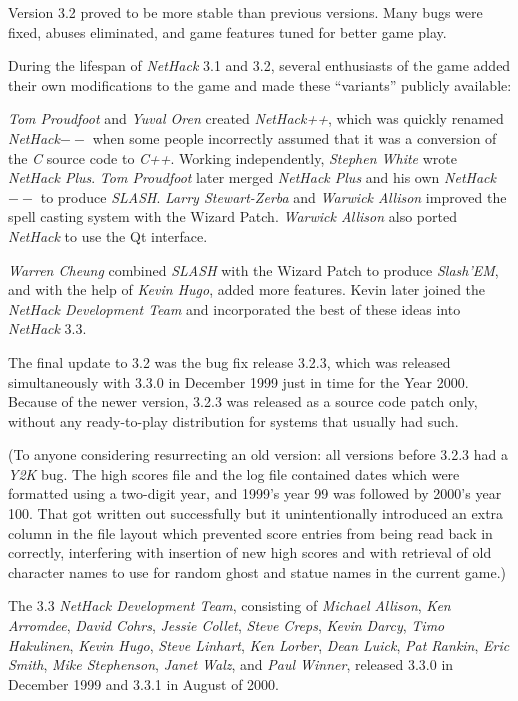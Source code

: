\documentclass[titlepage]{article}
\begin{document}
Version 3.2 proved to be more stable than previous versions.
Many bugs were fixed, abuses eliminated, and game features tuned for
better game play.

\medskip
During the lifespan of \textit{NetHack} 3.1 and 3.2, several enthusiasts
of the game added
their own modifications to the game and made these ``variants'' publicly
available:

\medskip
\textit{Tom Proudfoot} and \textit{Yuval Oren} created \textit{NetHack++},
which was quickly renamed \textit{NetHack$--$}
when some people incorrectly assumed that it was a conversion of the
\textit{C} source code to \textit{C++}.
Working independently, \textit{Stephen White} wrote \textit{NetHack Plus}.
\textit{Tom Proudfoot} later merged \textit{NetHack Plus}
and his own \textit{NetHack$--$} to produce \textit{SLASH}.
\textit{Larry Stewart-Zerba} and \textit{Warwick Allison} improved the spell
casting system with the Wizard Patch.
\textit{Warwick Allison} also ported \textit{NetHack} to use the Qt interface.

\medskip
\textit{Warren Cheung} combined \textit{SLASH} with the Wizard Patch
to produce \textit{Slash'EM}, and
with the help of \textit{Kevin Hugo}, added more features.
Kevin later joined the \textit{NetHack Development Team} and incorporated
the best of these ideas into \textit{NetHack} 3.3.

\medskip
The final update to 3.2 was the bug fix release 3.2.3, which was released
simultaneously with 3.3.0 in December 1999 just in time for the Year 2000.
Because of the newer version, 3.2.3 was released as a source code patch only,
without any ready-to-play distribution for systems that usually had such.

(To anyone considering resurrecting an old version:  all versions before
3.2.3 had a \textit{Y2K} bug.
The high scores file and the log file contained
dates which were formatted using a two-digit year, and 1999's year 99 was
followed by 2000's year 100.
That got written out successfully but it
unintentionally introduced an extra column in the file layout which prevented
score entries from being read back in correctly, interfering with insertion
of new high scores and with retrieval of old character names to use for
random ghost and statue names in the current game.)

\medskip
The 3.3 \textit{NetHack Development Team}, consisting of \textit{Michael Allison}, \textit{Ken Arromdee},
\textit{David Cohrs}, \textit{Jessie Collet}, \textit{Steve Creps}, \textit{Kevin Darcy},
\textit{Timo Hakulinen}, \textit{Kevin Hugo}, \textit{Steve Linhart}, \textit{Ken Lorber},
\textit{Dean Luick}, \textit{Pat Rankin}, \textit{Eric Smith}, \textit{Mike Stephenson},
\textit{Janet Walz}, and \textit{Paul Winner}, released 3.3.0 in
December 1999 and 3.3.1 in August of 2000.
\end{document}
